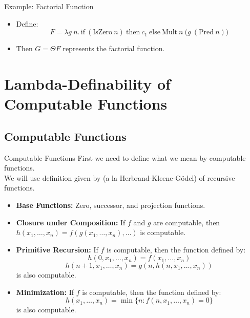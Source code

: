\documentclass{beamer}
\begin{document}
\begin{frame}{Example: Factorial Function}
  \begin{itemize}
    \item Define:
      \[
      F = \lambda g\ n.\, \text{if}\ (\text{IsZero}\ n)\ \text{then}\ c_1\ \text{else}\ \text{Mult}\ n\ \bigl(g\ (\text{Pred}\ n)\bigr)
      \]
    \item Then \(G = \Theta F\) represents the factorial function.
  \end{itemize}
  \vspace{-0.5em} %
\end{frame}

\section{Lambda-Definability of Computable Functions}

\subsection{Computable Functions}
\begin{frame}{Computable Functions}
  First we need to define what we mean by computable functions.\\
  We will use definition given by (a la Herbrand-Kleene-Gödel) of recursive functions.

  \begin{itemize}
    \item \textbf{Base Functions:} Zero, successor, and projection functions.
    \item \textbf{Closure under Composition:} If \(f\) and \(g\) are computable, then \(h(x_1,\dots,x_n) = f(g(x_1,\dots,x_n),\dots)\) is computable.
    \item \textbf{Primitive Recursion:} If \(f\) is computable, then the function defined by:
      \[
      h(0,x_1,\dots,x_n) = f(x_1,\dots,x_n)
      \]
      \[
      h(n+1,x_1,\dots,x_n) = g(n,h(n,x_1,\dots,x_n))
      \]
      is also computable.
    \item \textbf{Minimization:} If \(f\) is computable, then the function defined by:
      \[
      h(x_1,\dots,x_n) = \min\{n : f(n,x_1,\dots,x_n) = 0\}
      \]
      is also computable.
  \end{itemize}
\end{frame}
\end{document}
